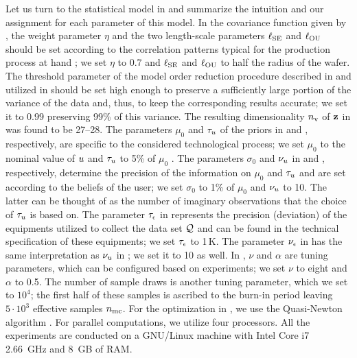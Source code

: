 Let us turn to the statistical model in  and summarize the intuition and our assignment for each parameter of this model.
In the covariance function given by , the weight parameter $\eta$ and the two length-scale parameters $\ell_{\text{SE}}$ and $\ell_{\text{OU}}$ should be set according to the correlation patterns typical for the production process at hand \cite{chandrakasan2001, cheng2011}; we set $\eta$ to 0.7 and $\ell_{\text{SE}}$ and $\ell_{\text{OU}}$ to half the radius of the wafer.
The threshold parameter of the model order reduction procedure described in  and utilized in  should be set high enough to preserve a sufficiently large portion of the variance of the data and, thus, to keep the corresponding results accurate; we set it to 0.99 preserving 99\% of this variance. The resulting dimensionality ${n_\text{v}}$ of $\mathbf{z}$ in  was found to be 27--28.
The parameters $\mu_0$ and $\tau_u$ of the priors in  and , respectively, are specific to the considered technological process; we set $\mu_0$ to the nominal value of $u$ and $\tau_u$ to 5\% of $\mu_0$ \cite{juan2012}.
The parameters $\sigma_0$ and $\nu_u$ in  and , respectively, determine the precision of the information on $\mu_0$ and $\tau_u$ and are set according to the beliefs of the user; we set $\sigma_0$ to 1\% of $\mu_0$ and $\nu_u$ to 10.
The latter can be thought of as the number of imaginary observations that the choice of $\tau_u$ is based on.
The parameter $\tau_\epsilon$ in  represents the precision (deviation) of the equipments utilized to collect the data set $\mathcal{Q}$ and can be found in the technical specification of these equipments; we set $\tau_\epsilon$ to 1$\,$K. The parameter $\nu_\epsilon$ in  has the same interpretation as $\nu_u$ in ; we set it to 10 as well.
In , $\nu$ and $\alpha$ are tuning parameters, which can be configured based on experiments; we set $\nu$ to eight and $\alpha$ to 0.5.
The number of sample draws is another tuning parameter, which we set to $10^4$; the first half of these samples is ascribed to the burn-in period leaving $5 \cdot 10^3$ effective samples ${n_\text{mc}}$.
For the optimization in , we use the Quasi-Newton algorithm \cite{press2007}.
For parallel computations, we utilize four processors.
All the experiments are conducted on a GNU/Linux machine with Intel Core i7 2.66~GHz and 8~GB of RAM.

